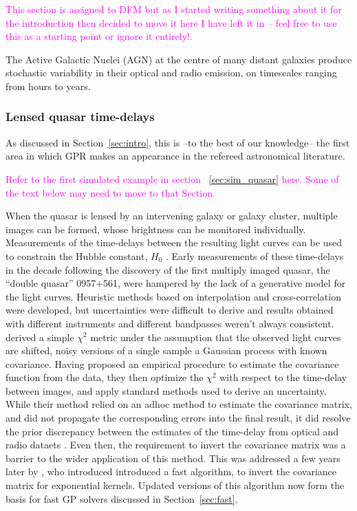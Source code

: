 \documentclass[letterpaper]{ar-1col}
\newcommand{\suz}[1]{\textcolor{magenta}{#1}}
\begin{document}
\suz{This section is assigned to DFM but as I started writing something about it for the introduction then decided to move it here I have left it in -- feel free to use this as a starting point or ignore it entirely!.}

The Active Galactic Nuclei (AGN) at the centre of many distant galaxies produce stochastic variability in their optical and radio emission, on timescales ranging from hours to years.

\subsubsection{Lensed quasar time-delays}

As discussed in Section~\ref{sec:intro}, this is --to the best of our knowledge-- the first area in which GPR makes an appearance in the refereed astronomical literature.

\suz{Refer to the first simulated example in section ~\ref{sec:sim_quasar} here. Some of the text below may need to move to that Section.}

When the quasar is lensed by an intervening galaxy or galaxy cluster, multiple images can be formed, whose brightness can be monitored individually. Measurements of the time-delays between the resulting light curves can be used to constrain the Hubble constant, $H_0$ \citep{doi:10.1146/annurev.aa.30.090192.001523}. Early measurements of these time-delays in the decade following the discovery of the first multiply imaged quasar, the ``double quasar'' 0957$+$561, were hampered by the lack of a generative model for the light curves. Heuristic methods based on interpolation and cross-correlation were developed, but uncertainties were difficult to derive and results obtained with different instruments and different bandpasses weren't always consistent. \citet{prh92a} derived a simple $\chi^2$ metric under the assumption that the observed light curves are shifted, noisy versions of a single sample a Gaussian process with known covariance. Having proposed an empirical procedure to estimate the covariance function from the data, they then optimize the $\chi^2$ with respect to the time-delay between images, and apply standard methods used to derive an uncertainty. While their method relied on an adhoc method to estimate the covariance matrix, and did not propagate the corresponding errors into the final result, it did resolve the prior discrepancy between the estimates of the time-delay from optical and radio dataets \citet{prh92b}. Even then, the requirement to invert the covariance matrix was a barrier to the wider application of this method. This was addressed a few years later by \citet{pr95}, who introduced introduced a fast algorithm, to invert the covariance matrix for exponential kernels. Updated versions of this algorithm now form the basis for fast GP solvers discussed in Section~\ref{sec:fast}.
\end{document}
